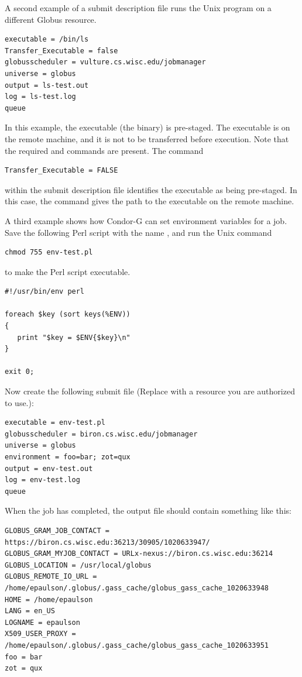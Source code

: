 A second example of a submit description file runs the Unix 
program on a different Globus resource.

\begin{verbatim}
executable = /bin/ls
Transfer_Executable = false
globusscheduler = vulture.cs.wisc.edu/jobmanager
universe = globus
output = ls-test.out
log = ls-test.log
queue
\end{verbatim} 

In this example, the executable (the binary) is pre-staged.
The executable is on the remote machine, and it is not to
be transferred before execution.
Note that the required 
 and 
commands are present.
The command
\begin{verbatim}
Transfer_Executable = FALSE
\end{verbatim}
within the submit description file identifies the executable
as being pre-staged.
In this case, the 
command gives the path to the executable on the remote machine.

A third example shows how
Condor-G can set environment variables for a job.
Save the following Perl script with the name ,
and run the Unix command
\begin{verbatim}
chmod 755 env-test.pl
\end{verbatim}
to make the Perl script executable.

\begin{verbatim}
#!/usr/bin/env perl

foreach $key (sort keys(%ENV))
{
   print "$key = $ENV{$key}\n"
}

exit 0;
\end{verbatim}

Now create the following submit file
(Replace  with a resource
you are authorized to use.):

\begin{verbatim}
executable = env-test.pl
globusscheduler = biron.cs.wisc.edu/jobmanager
universe = globus
environment = foo=bar; zot=qux
output = env-test.out
log = env-test.log
queue
\end{verbatim}

When the job has completed, the output file 
should contain something like this:

\begin{verbatim}
GLOBUS_GRAM_JOB_CONTACT = https://biron.cs.wisc.edu:36213/30905/1020633947/
GLOBUS_GRAM_MYJOB_CONTACT = URLx-nexus://biron.cs.wisc.edu:36214
GLOBUS_LOCATION = /usr/local/globus
GLOBUS_REMOTE_IO_URL = /home/epaulson/.globus/.gass_cache/globus_gass_cache_1020633948
HOME = /home/epaulson
LANG = en_US
LOGNAME = epaulson
X509_USER_PROXY = /home/epaulson/.globus/.gass_cache/globus_gass_cache_1020633951
foo = bar
zot = qux
\end{verbatim}


